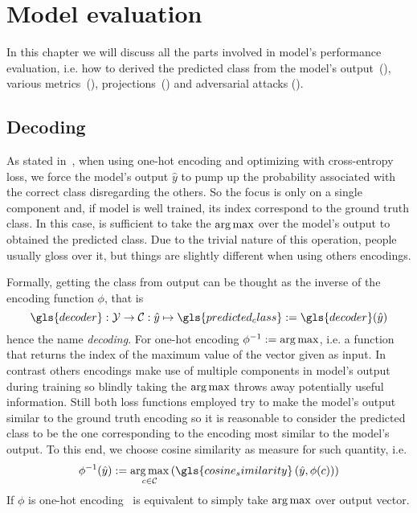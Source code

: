 \chapter{Model evaluation}
\label{ch:model-evaluation}

In this chapter we will discuss all the parts involved in model's performance
evaluation, i.e. how to derived the predicted class from the model's
output~(), various metrics~(),
projections~() and adversarial attacks
().

\section{Decoding}
\label{sec:decoding}
As stated in~, when using one-hot encoding and
optimizing with cross-entropy loss, we force the model's output $\hat{y}$ to
pump up the probability associated with the correct class disregarding the
others. So the focus is only on a single component and, if model is well
trained, its index correspond to the ground truth class. In this case, is
sufficient to take the $\operatorname*{arg\,max}$ over the model's output to obtained the
predicted class. Due to the trivial nature of this operation, people usually
gloss over it, but things are slightly different when using others
encodings.\medskip

Formally, getting the class from output can be thought as the inverse of the
encoding function $\phi$, that is
\begin{equation}
  \gls{decoder} : \mathcal{Y} \to \mathcal{C}
  : \hat{y} \mapsto \gls{predicted_class} := \gls{decoder}(\hat{y})
  \label{eq:decoding}
\end{equation}
hence the name \emph{decoding}. For one-hot encoding $\phi^{-1} := \operatorname*{arg\,max}$,
i.e. a function that returns the index of the maximum value of the vector given
as input. In contrast others encodings make use of multiple components in
model's output during training so blindly taking the $\operatorname*{arg\,max}$ throws away
potentially useful information. Still both loss functions employed try to make
the model's output similar to the ground truth encoding so it is reasonable to
consider the predicted class to be the one corresponding to the encoding most
similar to the model's output. To this end, we choose cosine similarity as
measure for such quantity, i.e.
\begin{equation}
  \phi^{-1}(\hat{y}) := \argmax_{c \in \mathcal{C}}
  \left( \gls{cosine_similarity} \left(\hat{y}, \phi(c) \right) \right)
  \label{eq:decoding-cos-sim}
\end{equation}
If $\phi$ is one-hot encoding~ is equivalent to simply
take $\operatorname*{arg\,max}$ over output vector.

